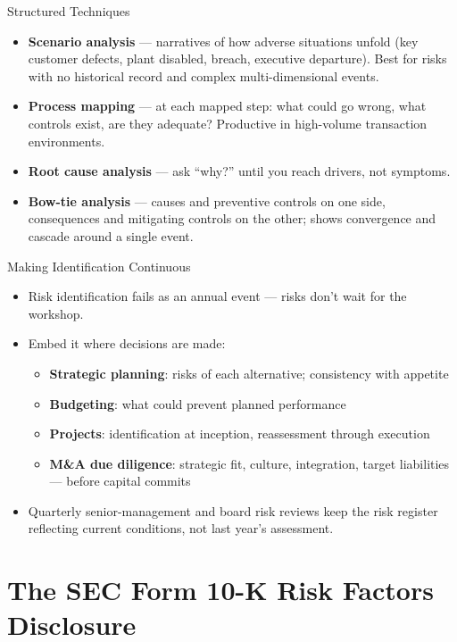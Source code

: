 \documentclass[11pt, aspectratio=169]{beamer}
\begin{document}
\begin{frame}{Structured Techniques}
\begin{itemize}
  \item \textbf{Scenario analysis} --- narratives of how adverse situations unfold (key customer defects, plant disabled, breach, executive departure). Best for risks with no historical record and complex multi-dimensional events.
  \item \textbf{Process mapping} --- at each mapped step: what could go wrong, what controls exist, are they adequate? Productive in high-volume transaction environments.
  \item \textbf{Root cause analysis} --- ask ``why?'' until you reach drivers, not symptoms.
  \item \textbf{Bow-tie analysis} --- causes and preventive controls on one side, consequences and mitigating controls on the other; shows convergence and cascade around a single event.
\end{itemize}
\end{frame}

\begin{frame}{Making Identification Continuous}
\begin{itemize}
  \item Risk identification fails as an annual event --- risks don't wait for the workshop.
  \item Embed it where decisions are made:
  \begin{itemize}
    \item \textbf{Strategic planning}: risks of each alternative; consistency with appetite
    \item \textbf{Budgeting}: what could prevent planned performance
    \item \textbf{Projects}: identification at inception, reassessment through execution
    \item \textbf{M\&A due diligence}: strategic fit, culture, integration, target liabilities --- before capital commits
  \end{itemize}
  \item Quarterly senior-management and board risk reviews keep the \alert{risk register} reflecting current conditions, not last year's assessment.
\end{itemize}
\end{frame}

\section{The SEC Form 10-K Risk Factors Disclosure}
\end{document}
